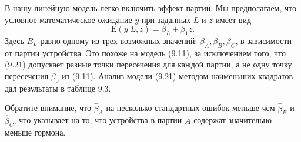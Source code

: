 В нашу линейную модель легко включить эффект партии. Мы предполагаем, что условное математическое ожидание $y$ при заданных $L$ и $z$ имеет вид
\begin{equation}
	\text{E}(y|L,z) = \beta_L + \beta_1 z.
\end{equation}
Здесь $B_L$ равно одному из трех возможных значений: $\beta_A, \beta_B, \beta_C$, в зависимости от партии устройства. Это похоже на модель (9.11), за исключением того, что (9.21) допускает разные точки пересечения для каждой партии, а не одну точку пересечения $\beta_0$ из (9.11). Анализ модели (9.21) методом наименьших квадратов дал результаты в таблице 9.3.

Обратите внимание, что $\hat{\beta}_A$ на несколько стандартных ошибок меньше чем $\hat{\beta}_B$ и $\hat{\beta}_C$, что указывает на то, что устройства в партии $A$ содержат значительно меньше гормона.